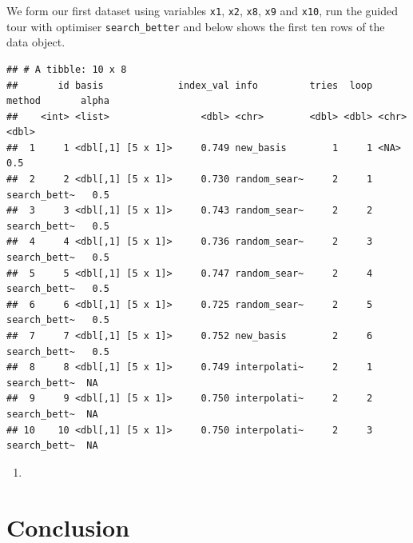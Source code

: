 \documentclass[12pt]{article}
\begin{document}
We form our first dataset using variables \texttt{x1}, \texttt{x2},
\texttt{x8}, \texttt{x9} and \texttt{x10}, run the guided tour with
optimiser \texttt{search\_better} and below shows the first ten rows of
the data object.

\newpage

\begin{verbatim}
## # A tibble: 10 x 8
##       id basis             index_val info         tries  loop method       alpha
##    <int> <list>                <dbl> <chr>        <dbl> <dbl> <chr>        <dbl>
##  1     1 <dbl[,1] [5 x 1]>     0.749 new_basis        1     1 <NA>           0.5
##  2     2 <dbl[,1] [5 x 1]>     0.730 random_sear~     2     1 search_bett~   0.5
##  3     3 <dbl[,1] [5 x 1]>     0.743 random_sear~     2     2 search_bett~   0.5
##  4     4 <dbl[,1] [5 x 1]>     0.736 random_sear~     2     3 search_bett~   0.5
##  5     5 <dbl[,1] [5 x 1]>     0.747 random_sear~     2     4 search_bett~   0.5
##  6     6 <dbl[,1] [5 x 1]>     0.725 random_sear~     2     5 search_bett~   0.5
##  7     7 <dbl[,1] [5 x 1]>     0.752 new_basis        2     6 search_bett~   0.5
##  8     8 <dbl[,1] [5 x 1]>     0.749 interpolati~     2     1 search_bett~  NA  
##  9     9 <dbl[,1] [5 x 1]>     0.750 interpolati~     2     2 search_bett~  NA  
## 10    10 <dbl[,1] [5 x 1]>     0.750 interpolati~     2     3 search_bett~  NA
\end{verbatim}

\begin{enumerate}
\def\labelenumi{\arabic{enumi}.}
\setcounter{enumi}{1}
\item
\end{enumerate}

\hypertarget{conclusion}{%
\section{Conclusion}\label{conclusion}}

\clearpage



\end{document}
